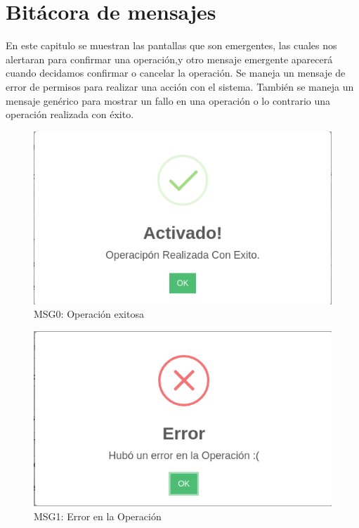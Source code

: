 \chapter{Bitácora de mensajes}
En este capitulo se muestran las pantallas que son emergentes,
las cuales nos alertaran para confirmar una operación,y otro mensaje emergente
aparecerá cuando decidamos confirmar o cancelar la operación.
Se maneja un mensaje de error de permisos para realizar una acción con el sistema.
También se maneja un  mensaje genérico para mostrar un fallo en una operación
o lo contrario una operación realizada con éxito.

\begin{figure}[htbp!]
	\begin{center}
		\includegraphics[scale=.5]{Pantallas/OperacionExitosa}
		\caption{MSG0: Operación exitosa}
	\end{center}
\end{figure}



\begin{figure}[htbp!]
	\begin{center}
		\includegraphics[scale=.5]{Pantallas/ErrorOperacion}
		\caption{MSG1: Error en la Operación}
	\end{center}
\end{figure}


